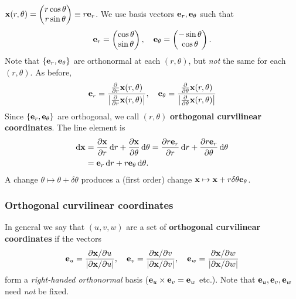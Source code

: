 \begin{example}
    $ \mathbf{x}(r,\theta)=\begin{pmatrix}
        r\cos \theta \\ r\sin\theta
    \end{pmatrix}\equiv r{\bf e}_r $. We use basis vectors $ {\bf e}_r,{\bf e}_\theta $ such that 
    \[
        {\bf e}_r=\begin{pmatrix}
            \cos\theta \\ \sin\theta
        \end{pmatrix},\quad {\bf e}_\theta = \begin{pmatrix}
            -\sin \theta  \\\cos \theta 
        \end{pmatrix}.
    \]
    Note that $ \{{\bf e}_r,{\bf e}_\theta\} $ are orthonormal at each $ (r,\theta) $, but \textit{not} the same for each $ (r,\theta) $. As before,
    \[
        {\bf e}_r = \frac{\frac{\partial }{\partial r}{\bf x}(r,\theta) }{\left| \frac{\partial }{\partial r}{\bf x}(r,\theta) \right| },\quad {\bf e}_\theta=\frac{\frac{\partial }{\partial \theta}{\bf x}(r,\theta) }{\left| \frac{\partial }{\partial \theta}{\bf x}(r,\theta) \right| }
    \]
    Since $ \{{\bf e}_r,{\bf e}_\theta\} $ are orthogonal, we call $ (r,\theta) $ \textbf{orthogonal curvilinear coordinates}. The line element is 
    \begin{align*}
        \mathrm{d} {\bf x}&= \frac{\partial {\bf x}}{\partial r}\,\mathrm{d} r+\frac{\partial {\bf x}}{\partial \theta}\,\mathrm{d} \theta = \frac{\partial r{\bf e}_r}{\partial r}\,\mathrm{d} r+\frac{\partial r{\bf e}_r}{\partial \theta}\,\mathrm{d} \theta\\ 
        &= {\bf e}_r \,\mathrm{d} r+ r{\bf e}_\theta\,\mathrm{d} \theta.
    \end{align*}
    A change $ \theta \mapsto \theta+ \delta \theta $ produces a (first order) change $ \mathbf{x}\mapsto \mathbf{x}+r\delta \theta{\bf e}_\theta  $.
\end{example}

\subsubsection{Orthogonal curvilinear coordinates}
In general we say that $(u, v, w)$ are a set of \textbf{orthogonal curvilinear coordinates} if the vectors
\[
    {\bf e}_u = \frac{\partial {\bf x}/\partial u }{\left| \partial {\bf x}/\partial u \right| },\quad {\bf e}_v=\frac{\partial {\bf x}/\partial v }{\left| \partial {\bf x}/\partial v \right| },\quad {\bf e}_w=\frac{\partial {\bf x}/\partial w }{\left| \partial {\bf x}/\partial w \right| }
\]
form a \textit{right-handed orthonormal} basis ($ {\bf e}_u\times{\bf e}_v={\bf e}_w $ etc.). Note that $ {\bf e}_u,{\bf e}_v,{\bf e}_w $ need \textit{not} be fixed.

